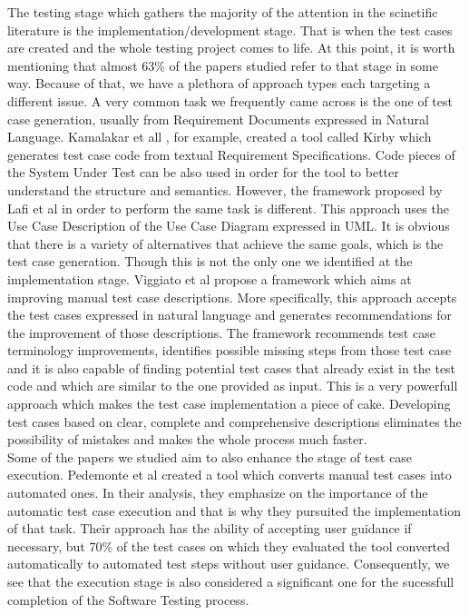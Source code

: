 The testing stage which gathers the majority of the attention in the scinetific literature is the implementation/development stage. That is when the test cases are created and the whole testing 
project comes to life. At this point, it is worth mentioning that almost 63\% of the papers studied refer to that stage in some way. Because of that, we have a plethora of approach types each 
targeting a different issue. A very common task we frequently came across is the one of test case generation, usually from Requirement Documents expressed in Natural Language. Kamalakar et all 
\cite{kamalakar2013automatically}, for example, created a tool called Kirby which generates test case code from textual Requirement Specifications. Code pieces of the System Under Test 
can be also used in order for the tool to better understand the structure and semantics. However, the framework proposed by Lafi et al \cite{9491761} in order to perform the same task is different. 
This approach uses the Use Case Description of the Use Case Diagram expressed in UML. It is obvious that there is a variety of alternatives that achieve the same goals, which is the test case generation. 
Though this is not the only one we identified at the implementation stage. Viggiato et al \cite{viggiato2022using} propose a framework which aims at improving manual test case descriptions. More specifically, 
this approach accepts the test cases expressed in natural language and generates recommendations for the improvement of those descriptions. The framework recommends test case terminology improvements, 
identifies possible missing steps from those test case and it is also capable of finding potential test cases that already exist in the test code and which are similar to the one provided as input. This 
is a very powerfull approach which makes the test case implementation a piece of cake. Developing test cases based on clear, complete and comprehensive descriptions eliminates the possibility of 
mistakes and makes the whole process much faster. \\

Some of the papers we studied aim to also enhance the stage of test case execution. Pedemonte et al \cite{pedemonte2012towards} created a tool which converts manual test cases into automated ones. 
In their analysis, they emphasize on the importance of the automatic test case execution and that is why they pursuited the implementation of that task. Their approach has the ability of accepting user 
guidance if necessary, but 70\% of the test cases on which they evaluated the tool converted automatically to automated test steps without user guidance. Consequently, we see that the execution stage is also 
considered a significant one for the sucessfull completion of the Software Testing process. \\

